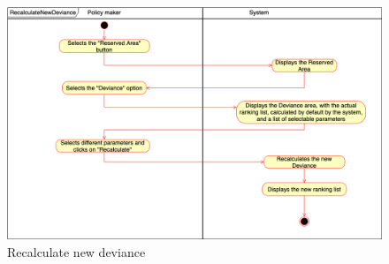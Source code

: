     \begin{figure}[h!]
        \centering
        \includegraphics[scale=0.35]{images/use_cases_diagram/policymaker_recalculate_deviance.png}
        \caption{Recalculate new deviance}
        \label{fig:policymaker_recalculate_deviance}
    \end{figure}
    \FloatBarrier
